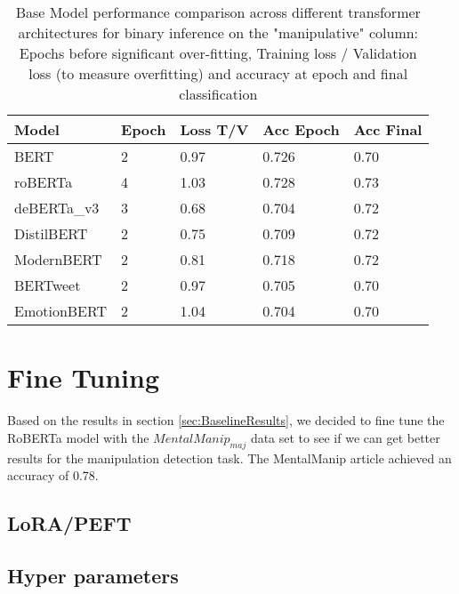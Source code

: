 \documentclass[
	letterpaper, %
	12pt, %
	unnumberedsections, %
	twoside, %
]{LTJournalArticle}
\begin{document}
\begin{table}[h!]
	\small
	\begin{tabular}{|p{2.2cm}|p{0.9cm}|p{1cm}|p{1cm}|p{1cm}|}
		\hline
		\textbf{Model} & \textbf{Epoch} & \textbf{Loss T/V} & \textbf{Acc Epoch} & \textbf{Acc Final} \\
		\hline
		BERT           & 2              & 0.97              & 0.726              & 0.70               \\
		roBERTa        & 4              & 1.03              & 0.728              & 0.73               \\
		deBERTa\_v3    & 3              & 0.68              & 0.704              & 0.72               \\
		DistilBERT     & 2              & 0.75              & 0.709              & 0.72               \\
		ModernBERT     & 2              & 0.81              & 0.718              & 0.72               \\
		BERTweet       & 2              & 0.97              & 0.705              & 0.70               \\
		EmotionBERT    & 2              & 1.04              & 0.704              & 0.70               \\


		\hline
	\end{tabular}
	\caption{Base Model performance comparison across different transformer architectures for binary inference on the "manipulative" column: Epochs before significant over-fitting, Training loss / Validation loss (to measure  overfitting) and accuracy at epoch and final classification }
	\label{tab:BaseModelPerformance}
\end{table}

\section{Fine Tuning}
Based on the results in section \ref{sec:BaselineResults}, we decided to fine tune the RoBERTa model with the $MentalManip_{maj}$ data set to see if we can get better results for the manipulation detection task. The MentalManip article\cite{MentalManip} achieved an accuracy of 0.78.

\subsection{LoRA/PEFT}
\subsection{Hyper parameters}
\end{document}

